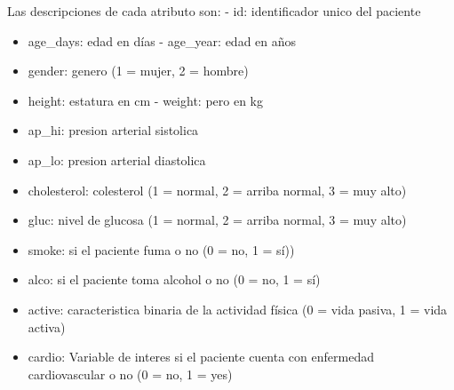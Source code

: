 \documentclass[
  10pt,
]{article}
\begin{document}
\begin{table}[H]

\caption{\label{tab:unnamed-chunk-1}Primeras 6 filas del dataset cardiovascular\_disease.csv}
\centering
{}
\end{table}

Las descripciones de cada atributo son: - id: identificador unico del
paciente

\begin{itemize}
\item
  age\_days: edad en días - age\_year: edad en años
\item
  gender: genero (1 = mujer, 2 = hombre)
\item
  height: estatura en cm - weight: pero en kg
\item
  ap\_hi: presion arterial sistolica
\item
  ap\_lo: presion arterial diastolica
\item
  cholesterol: colesterol (1 = normal, 2 = arriba normal, 3 = muy alto)
\item
  gluc: nivel de glucosa (1 = normal, 2 = arriba normal, 3 = muy alto)
\item
  smoke: si el paciente fuma o no (0 = no, 1 = sí))
\item
  alco: si el paciente toma alcohol o no (0 = no, 1 = sí)
\item
  active: caracteristica binaria de la actividad física (0 = vida
  pasiva, 1 = vida activa)
\item
  cardio: Variable de interes si el paciente cuenta con enfermedad
  cardiovascular o no (0 = no, 1 = yes)
\end{itemize}
\end{document}
